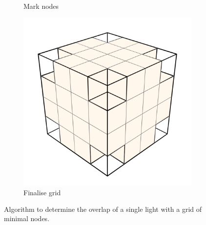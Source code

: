 \begin{figure}[t]
\begin{subfigure}[b]{.3\linewidth}
    \caption{\footnotesize Mark nodes}%
    \label{fig:hs-p1h}%
  \end{subfigure}
  \begin{subfigure}[b]{.3\linewidth}
    \includegraphics[width=\textwidth]{./img/raw/hs-slt-algorithm/hs-slt-algorithm-9.png}%
    \caption{\footnotesize Finalise grid}%
    \label{fig:hs-p1i}%
  \end{subfigure}

  \caption{Algorithm to determine the overlap of a single light with a grid of minimal nodes.}
  \label{fig:hs-p1}
\end{figure}
